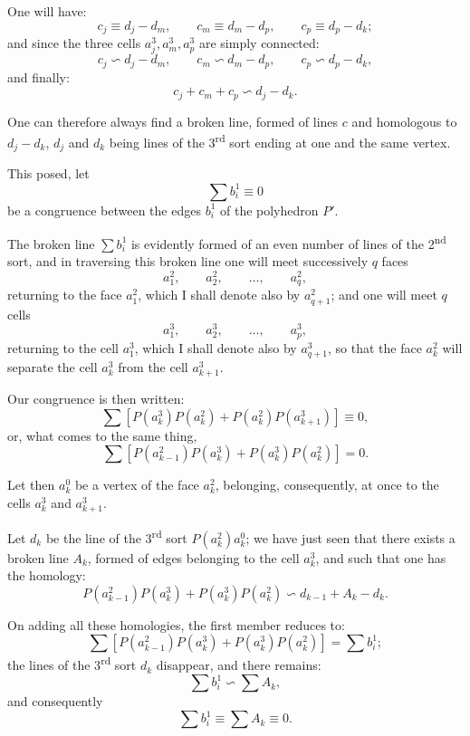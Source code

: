 \documentclass{article}
\begin{document}
One will have:
\[ c_{j} \equiv d_{j} - d_{m}, \qquad c_{m} \equiv d_{m} - d_{p}, \qquad c_{p} \equiv d_{p} - d_{k}; \]
and since the three cells $a^{3}_{j}, a^{3}_{m}, a^{3}_{p}$ are simply connected:
\[ c_{j} \backsim d_{j} - d_{m}, \qquad c_{m} \backsim d_{m} - d_{p}, \qquad c_{p} \backsim d_{p} - d_{k}, \]
and finally:
\[ c_{j} + c_{m} + c_{p} \backsim d_{j} - d_{k}. \]

One can therefore always find a broken line, formed of lines $c$ and homologous to $d_{j} - d_{k}$, $d_{j}$ and $d_{k}$ being lines of the 3\textsuperscript{rd} sort ending at one and the same vertex.

This posed, let
\[ \sum b^{1}_{i} \equiv 0 \tag{1} \]
be a congruence between the edges $b^{1}_{i}$ of the polyhedron $P'$.

The broken line $\displaystyle\sum b^{1}_{i}$ is evidently formed of an even number of lines of the 2\textsuperscript{nd} sort, and in traversing this broken line one will meet successively $q$ faces
\[ a^{2}_{1}, \qquad a^{2}_{2}, \qquad \ldots, \qquad a^{2}_{q}, \]
returning to the face $a^{2}_{1}$, which I shall denote also by $a^{2}_{q+1}$; and one will meet $q$ cells
\[ a^{3}_{1}, \qquad a^{3}_{2}, \qquad \ldots, \qquad a^{3}_{p}, \] 
returning to the cell $a^{3}_{1}$, which I shall denote also by $a^{3}_{q+1}$, so that the face $a^{2}_{k}$ will separate the cell $a^{3}_{k}$ from the cell $a^{3}_{k+1}$.

Our congruence is then written:
\[ \sum [P(a^{3}_{k}) P(a^{2}_{k}) + P(a^{2}_{k}) P(a^{3}_{k+1})] \equiv 0, \]
or, what comes to the same thing,
\[ \sum [P(a^{2}_{k-1}) P(a^{3}_{k}) + P(a^{3}_{k}) P(a^{2}_{k})] = 0. \]

Let then $a^{0}_{k}$ be a vertex of the face $a^{2}_{k}$, belonging, consequently, at once to the cells $a^{3}_{k}$ and $a^{3}_{k+1}$.

Let $d_{k}$ be the line of the 3\textsuperscript{rd} sort $P(a^{2}_{k}) a^{0}_{k}$; we have just seen that there exists a broken line $A_{k}$, formed of edges belonging to the cell $a^{3}_{k}$, and such that one has the homology:
\[ P(a^{2}_{k-1}) P(a^{3}_{k}) + P(a^{3}_{k}) P(a^{2}_{k}) \backsim d_{k-1} + A_{k} - d_{k}. \]

On adding all these homologies, the first member reduces to:
\[ \sum [P(a^{2}_{k-1}) P(a^{3}_{k}) + P(a^{3}_{k}) P(a^{2}_{k})] = \sum b^{1}_{i}; \]
the lines of the 3\textsuperscript{rd} sort $d_{k}$ disappear, and there remains:
\[ \sum b^{1}_{i} \backsim \sum A_{k}, \]
and consequently
\[ \sum b^{1}_{i} \equiv \sum A_{k} \equiv 0. \]
\end{document}
